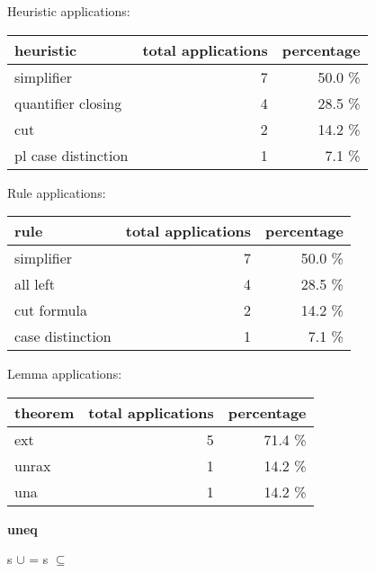 \documentclass[a4paper]{article}
\begin{document}
\medskip


Heuristic applications:

\begin{supertabular}{l|r|r}
heuristic	& total applications & percentage \\ \hline
simplifier & 7 & 50.0 \% \\
quantifier closing & 4 & 28.5 \% \\
cut & 2 & 14.2 \% \\
pl case distinction & 1 & 7.1 \% \\

\end{supertabular}

Rule applications:

\begin{supertabular}{l|r|r}
rule	        & total applications & percentage \\ \hline
simplifier & 7 & 50.0 \% \\
all left & 4 & 28.5 \% \\
cut formula & 2 & 14.2 \% \\
case distinction & 1 & 7.1 \% \\

\end{supertabular}

Lemma applications:

\begin{supertabular}{l|r|r}
theorem	        & total applications & percentage \\ \hline
ext & 5 & 71.4 \% \\
unrax & 1 & 14.2 \% \\
una & 1 & 14.2 \% \\

\end{supertabular}
\pagebreak

{\LARGE\bf uneq}\label{lemma-uneq}

\medskip

 \Fol s $\cup$  =  \Equiv s $\subseteq$ 
\end{document}
